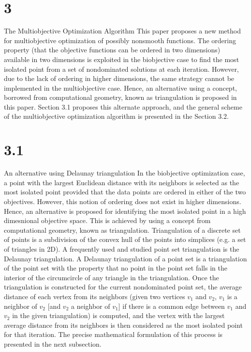 \section{3}{The Multiobjective Optimization Algorithm}
This paper proposes a new method for multiobjective optimization of possibly 
nonsmooth functions. The ordering property (that the objective functions can be
ordered in two dimensions) available in two dimensions is exploited in the
biobjective case to find the most isolated point from a set of nondominated
solutions at each iteration. However, due to the lack of ordering in higher
dimensions, the same strategy cannot be implemented in the multiobjective case.
Hence, an alternative using a concept, borrowed from computational geometry,
known as triangulation is proposed in this paper.  Section 3.1 proposes this
alternate approach, and the general scheme of the multiobjective optimization
algorithm is presented in the Section 3.2.

\section{3.1}{An alternative using Delaunay triangulation}
In the biobjective optimization case, a point with the largest Euclidean 
distance with its neighbors is selected as the most isolated point provided 
that the data points are ordered in either of the two objectives. However, 
this notion of ordering does not exist in higher dimensions. Hence, an alternative 
is proposed for identifying the most isolated point in a high dimesnional 
objective space. This is achieved by using a concept from computational geometry, 
known as triangulation. Triangulation of a discrete set of points is a
subdivision of the convex hull of the points into simplices (e.g. a set of 
triangles in 2D). A frequently used and studied point set triangulation is the
Delaunay triangulation. A Delaunay triangulation of a point set is a
triangulation of the point set with the property that no point in the point set
falls in the interior of the circumcircle of any triangle in the triangulation.
Once the triangulation is constructed for the current nondominated point set,
the average distance of each vertex from its neighbors (given two vertices
$v_1$ and $v_2$, $v_1$ is a neighbor of $v_2$ [and $v_2$ a neighbor of $v_1$]
if there is a common edge between $v_1$ and $v_2$ in the given triangulation)
is computed, and the vertex with the largest average distance from its
neighbors is then considered as the most isolated point for that iteration. The
precise mathematical formulation of this process is presented in the next
subsection. 

